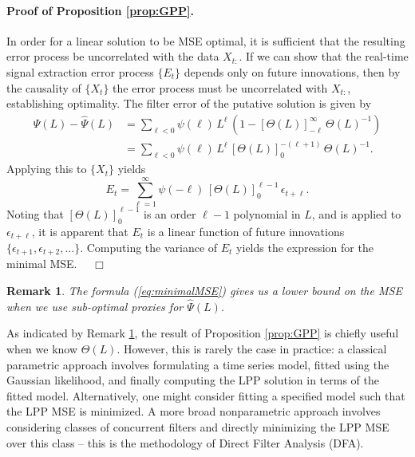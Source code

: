\documentclass[a4paper]{book}
\newtheorem{Remark}{Remark}
\begin{document}
\paragraph{Proof of Proposition \ref{prop:GPP}.}
 In order for a linear solution to be MSE optimal, it is sufficient that the
 resulting error process be uncorrelated with the data $X_{t:}$.
   If we can show that the real-time signal extraction error process $\{ E_t \}$
  depends only on future innovations, then by the causality of $\{ X_t \}$ the error process 
  must be uncorrelated   with $X_{t:}$, establishing optimality.  
 The filter error of the putative solution is  
  given by
\begin{align*}
 \Psi (L) - \widehat{\Psi} (L) & = \sum_{\ell < 0 } \psi (\ell) \, L^{\ell} \,
   \left( 1 -   {[ \Theta (L) ]}_{-\ell}^{\infty} \, { \Theta (L) }^{-1} \right) \\
  & =  \sum_{\ell < 0 } \psi (\ell) \, L^{\ell} \, 
  {[ \Theta (L) ]}_{0}^{ -(\ell + 1)} \, { \Theta (L) }^{-1}.
\end{align*}
 Applying this to $\{ X_t \}$ yields
\[
  E_t = \sum_{\ell =1 }^{\infty} \psi (-\ell) \, {[ \Theta (L) ]}_0^{\ell - 1} \, 
   \epsilon_{t + \ell }.
\]
  Noting that ${[ \Theta (L) ]}_0^{\ell - 1}$ is an order $\ell-1$ polynomial in $L$,
 and is applied to $\epsilon_{t+ \ell}$, it is apparent that $E_t$ is a linear function
 of future innovations $\{ \epsilon_{t+1}, \epsilon_{t+2}, \ldots \}$.  Computing
 the variance of $E_t$ yields the expression for the minimal MSE.  $\quad \Box$


\begin{Remark} \rm  
\label{rem:GPPsoln}
 The formula (\ref{eq:minimalMSE}) gives us a lower
 bound  on the MSE when we use sub-optimal proxies for $\widehat{\Psi} (L)$.
\end{Remark}

 As indicated by Remark \ref{rem:GPPsoln}, the result of Proposition \ref{prop:GPP}
 is chiefly useful when we know $\Theta (L)$.  However, this is rarely the case in 
 practice: a classical parametric approach involves formulating a time series model, fitted 
 using the Gaussian likelihood, and finally computing the LPP solution in terms of
 the fitted model.  Alternatively, one might consider fitting a specified model such that
 the LPP MSE is minimized.  A more broad nonparametric approach involves 
 considering classes of concurrent filters and directly minimizing the LPP MSE over
 this class -- this is the methodology of Direct Filter Analysis (DFA).
\end{document}
